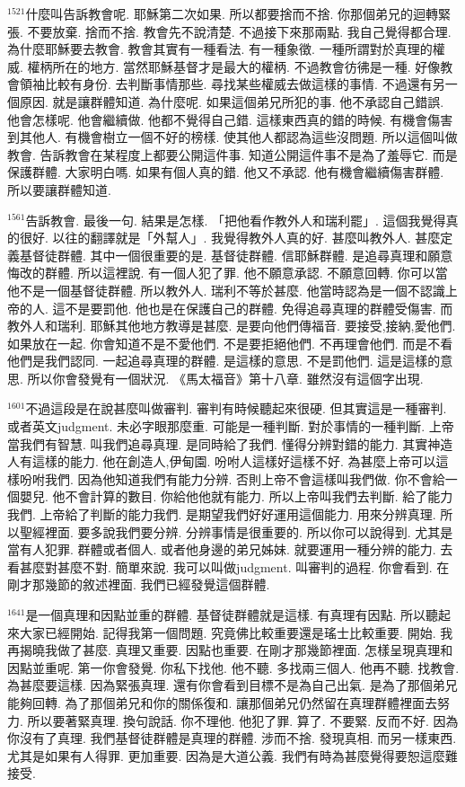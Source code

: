 \documentclass{book}
\begin{document}
$^{1521}$什麼叫告訴教會呢.
耶穌第二次如果.
所以都要捨而不捨.
你那個弟兄的迴轉緊張.
不要放棄.
捨而不捨.
教會先不說清楚.
不過接下來那兩點.
我自己覺得都合理.
為什麼耶穌要去教會.
教會其實有一種看法.
有一種象徵.
一種所謂對於真理的權威.
權柄所在的地方.
當然耶穌基督才是最大的權柄.
不過教會彷彿是一種.
好像教會領袖比較有身份.
去判斷事情那些.
尋找某些權威去做這樣的事情.
不過還有另一個原因.
就是讓群體知道.
為什麼呢.
如果這個弟兄所犯的事.
他不承認自己錯誤.
他會怎樣呢.
他會繼續做.
他都不覺得自己錯.
這樣東西真的錯的時候.
有機會傷害到其他人.
有機會樹立一個不好的榜樣.
使其他人都認為這些沒問題.
所以這個叫做教會.
告訴教會在某程度上都要公開這件事.
知道公開這件事不是為了羞辱它.
而是保護群體.
大家明白嗎.
如果有個人真的錯.
他又不承認.
他有機會繼續傷害群體.
所以要讓群體知道.

$^{1561}$告訴教會.
最後一句.
結果是怎樣.
「把他看作教外人和瑞利罷」.
這個我覺得真的很好.
以往的翻譯就是「外幫人」.
我覺得教外人真的好.
甚麼叫教外人.
甚麼定義基督徒群體.
其中一個很重要的是.
基督徒群體.
信耶穌群體.
是追尋真理和願意悔改的群體.
所以這裡說.
有一個人犯了罪.
他不願意承認.
不願意回轉.
你可以當他不是一個基督徒群體.
所以教外人.
瑞利不等於甚麼.
他當時認為是一個不認識上帝的人.
這不是要罰他.
他也是在保護自己的群體.
免得追尋真理的群體受傷害.
而教外人和瑞利.
耶穌其他地方教導是甚麼.
是要向他們傳福音.
要接受,接納,愛他們.
如果放在一起.
你會知道不是不愛他們.
不是要拒絕他們.
不再理會他們.
而是不看他們是我們認同.
一起追尋真理的群體.
是這樣的意思.
不是罰他們.
這是這樣的意思.
所以你會發覺有一個狀況.
《馬太福音》第十八章.
雖然沒有這個字出現.

$^{1601}$不過這段是在說甚麼叫做審判.
審判有時候聽起來很硬.
但其實這是一種審判.
或者英文judgment.
未必字眼那麼重.
可能是一種判斷.
對於事情的一種判斷.
上帝當我們有智慧.
叫我們追尋真理.
是同時給了我們.
懂得分辨對錯的能力.
其實神造人有這樣的能力.
他在創造人,伊甸園.
吩咐人這樣好這樣不好.
為甚麼上帝可以這樣吩咐我們.
因為他知道我們有能力分辨.
否則上帝不會這樣叫我們做.
你不會給一個嬰兒.
他不會計算的數目.
你給他他就有能力.
所以上帝叫我們去判斷.
給了能力我們.
上帝給了判斷的能力我們.
是期望我們好好運用這個能力.
用來分辨真理.
所以聖經裡面.
要多說我們要分辨.
分辨事情是很重要的.
所以你可以說得到.
尤其是當有人犯罪.
群體或者個人.
或者他身邊的弟兄姊妹.
就要運用一種分辨的能力.
去看甚麼對甚麼不對.
簡單來說.
我可以叫做judgment.
叫審判的過程.
你會看到.
在剛才那幾節的敘述裡面.
我們已經發覺這個群體.

$^{1641}$是一個真理和因點並重的群體.
基督徒群體就是這樣.
有真理有因點.
所以聽起來大家已經開始.
記得我第一個問題.
究竟佛比較重要還是瑤士比較重要.
開始.
我再揭曉我做了甚麼.
真理又重要.
因點也重要.
在剛才那幾節裡面.
怎樣呈現真理和因點並重呢.
第一你會發覺.
你私下找他.
他不聽.
多找兩三個人.
他再不聽.
找教會.
為甚麼要這樣.
因為緊張真理.
還有你會看到目標不是為自己出氣.
是為了那個弟兄能夠回轉.
為了那個弟兄和你的關係復和.
讓那個弟兄仍然留在真理群體裡面去努力.
所以要著緊真理.
換句說話.
你不理他.
他犯了罪.
算了.
不要緊.
反而不好.
因為你沒有了真理.
我們基督徒群體是真理的群體.
涉而不捨.
發現真相.
而另一樣東西.
尤其是如果有人得罪.
更加重要.
因為是大道公義.
我們有時為甚麼覺得要恕這麼難接受.
\end{document}
